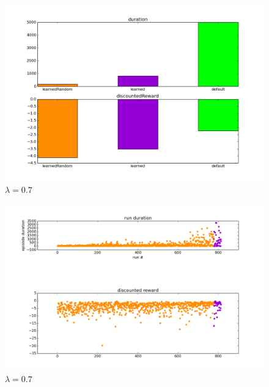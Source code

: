 \documentclass{article}
\begin{document}
\begin{figure}
\centering
\includegraphics[scale=0.5]{figures/sarsaDiscrete_lam_0_7_6500_bar_all_controllers.png}
\caption{$\lambda = 0.7$}
\label{figures/sarsaDiscrete_lam_0_7_6500_bar_all_controllers.png}
\end{figure}

\begin{figure}
\centering
\includegraphics[scale=0.5]{figures/sarsaDiscrete_lam_0_7_6500_time_series_learned_controllers.png}
\caption{$\lambda = 0.7$}
\label{figures/sarsaDiscrete_lam_0_7_6500_time_series_learned_controllers.png}
\end{figure}
\end{document}
